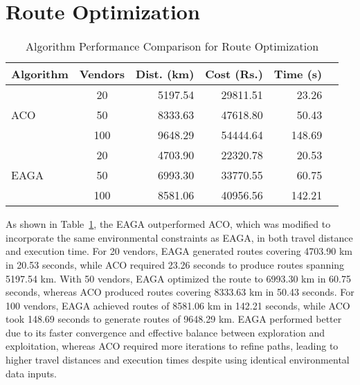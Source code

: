 \section{Route Optimization}
\begin{table}[htbp]
    \centering
    \small
    \caption{Algorithm Performance Comparison for Route Optimization}
    \label{tab:perf-ro}
    \begin{tabular}{lcrrrr}
        \toprule
        \textbf{Algorithm} & \textbf{Vendors} & \textbf{Dist. (km)} & \textbf{Cost (Rs.)} & \textbf{Time (s)} \\
        \midrule
        \multirow{3}{*}{ACO}
                           & 20               & 5197.54             & 29811.51            & 23.26             \\
                           & 50               & 8333.63             & 47618.80            & 50.43             \\
                           & 100              & 9648.29             & 54444.64            & 148.69            \\
        \midrule
        \multirow{3}{*}{EAGA}
                           & 20               & 4703.90             & 22320.78            & 20.53             \\
                           & 50               & 6993.30             & 33770.55            & 60.75             \\
                           & 100              & 8581.06             & 40956.56            & 142.21            \\
        \bottomrule
    \end{tabular}
\end{table}
As shown in Table~\ref{tab:perf-ro}, the EAGA outperformed ACO\cite{dorigo1997ant}, which was modified to incorporate the same environmental constraints as EAGA, in both travel distance and execution time. For 20 vendors, EAGA generated routes covering 4703.90 km in 20.53 seconds, while ACO required 23.26 seconds to produce routes spanning 5197.54 km. With 50 vendors, EAGA optimized the route to 6993.30 km in 60.75 seconds, whereas ACO produced routes covering 8333.63 km in 50.43 seconds. For 100 vendors, EAGA achieved routes of 8581.06 km in 142.21 seconds, while ACO took 148.69 seconds to generate routes of 9648.29 km. EAGA performed better due to its faster convergence and effective balance between exploration and exploitation, whereas ACO required more iterations to refine paths, leading to higher travel distances and execution times despite using identical environmental data inputs.


